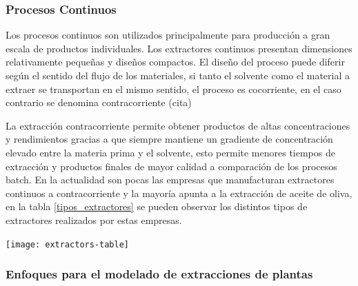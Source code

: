 \documentclass[11pt,a4paper]{article}
\begin{document}
\subsubsection{Procesos Continuos}

Los procesos continuos son utilizados principalmente para producción a gran escala de productos individuales. Los extractores continuos presentan dimensiones relativamente pequeñas y diseños compactos. El diseño del proceso puede diferir según el sentido del flujo de los materiales, si tanto el solvente como el material a extraer se transportan en el mismo sentido, el proceso es cocorriente, en el caso contrario se denomina contracorriente \cite{Kassing 2009} (cita)

La extracción contracorriente permite obtener productos de altas concentraciones y rendimientos gracias a que siempre mantiene un gradiente de concentración elevado entre la materia prima y el solvente, esto permite menores tiempos de extracción y productos finales de mayor calidad a comparación de los procesos batch. En la actualidad son pocas las empresas que manufacturan extractores continuos a contracorriente y la mayoría apunta a la extracción de aceite de oliva, en la tabla \ref{tipos_extractores} se pueden observar los distintos tipos de extractores realizados por estas empresas.


\begin{center}
	\texttt{[image: extractors-table]}
\end{center}

\begin{center}
	\begin{table}[h]
%	
%		
		\caption{Extractores sólido-líquido contracorriente - Fuente:\cite{Kassing 2009}\label{tipos_extractores}}
		
	\end{table}
\end{center}




\subsubsection{Enfoques para el modelado de extracciones de plantas}
\end{document}
